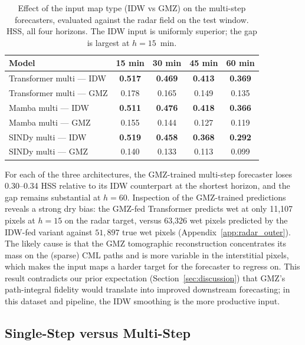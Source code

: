\documentclass[12pt, a4paper]{article}
\begin{document}
\begin{table}[h]
\centering
\caption{Effect of the input map type (IDW vs GMZ) on the multi-step
forecasters, evaluated against the radar field on the test window.
HSS, all four horizons. The IDW input is uniformly superior; the gap
is largest at $h\!=\!15$~min.}
\label{tab:idw_vs_gmz}
\begin{tabular}{lcccc}
\toprule
Model & 15 min & 30 min & 45 min & 60 min \\
\midrule
Transformer multi --- IDW & \textbf{0.517} & \textbf{0.469} & \textbf{0.413} & \textbf{0.369} \\
Transformer multi --- GMZ & 0.178 & 0.165 & 0.149 & 0.135 \\
\midrule
Mamba multi --- IDW       & \textbf{0.511} & \textbf{0.476} & \textbf{0.418} & \textbf{0.366} \\
Mamba multi --- GMZ       & 0.155 & 0.144 & 0.127 & 0.119 \\
\midrule
SINDy multi --- IDW       & \textbf{0.519} & \textbf{0.458} & \textbf{0.368} & \textbf{0.292} \\
SINDy multi --- GMZ       & 0.140 & 0.133 & 0.113 & 0.099 \\
\bottomrule
\end{tabular}
\end{table}

For each of the three architectures, the GMZ-trained multi-step
forecaster loses 0.30--0.34 HSS relative to its IDW counterpart at
the shortest horizon, and the gap remains substantial at $h\!=\!60$.
Inspection of the GMZ-trained predictions reveals a strong dry bias:
the GMZ-fed Transformer predicts wet at only 11{,}107 pixels at
$h\!=\!15$ on the radar target, versus 63{,}326 wet pixels predicted
by the IDW-fed variant against $51{,}897$ true wet pixels
(Appendix~\ref{app:radar_outer}). The likely cause is that the GMZ
tomographic reconstruction concentrates its mass on the (sparse) CML
paths and is more variable in the interstitial pixels, which makes
the input maps a harder target for the forecaster to regress on. This
result contradicts our prior expectation
(Section~\ref{sec:discussion}) that GMZ's path-integral fidelity
would translate into improved downstream forecasting; in this dataset
and pipeline, the IDW smoothing is the more productive input.

\subsection{Single-Step versus Multi-Step}
\end{document}
